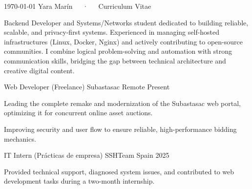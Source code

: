\documentclass[11pt, a4paper]{awesome-cv}
\begin{document}
\makecvheader[C]

\makecvfooter
  {\today}
  {Yara Marín~~~·~~~Curriculum Vitae}
  {\thepage}



\begin{cvparagraph}
Backend Developer and Systems/Networks student dedicated to building reliable, scalable, and privacy-first systems. Experienced in managing self-hosted infrastructures (Linux, Docker, Nginx) and actively contributing to open-source communities. I combine logical problem-solving and automation with strong communication skills, bridging the gap between technical architecture and creative digital content.
\end{cvparagraph}


\begin{cventries}

  \cventry
    {Web Developer (Freelance)} %
    {Subastasac} %
    {Remote} %
    {Present} %
    {
      \begin{cvitems} %
        \item {Leading the complete remake and modernization of the Subastasac web portal, optimizing it for concurrent online asset auctions.}
        \item {Improving security and user flow to ensure reliable, high-performance bidding mechanics.}
      \end{cvitems}
    }

  \cventry
    {IT Intern (Prácticas de empresa)} %
    {SSHTeam} %
    {Spain} %
    {2025} %
    {
      \begin{cvitems} %
        \item {Provided technical support, diagnosed system issues, and contributed to web development tasks during a two-month internship.}
      \end{cvitems}
    }

\end{cventries}
\end{document}
